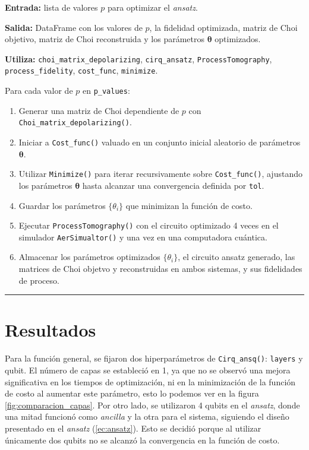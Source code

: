 \documentclass[letterpaper,12pt]{thesisECFM}
\theoremstyle{plain}
\theoremstyle{definition}
\theoremstyle{definition}
\theoremstyle{remark}
\newcommand{\1}{\mathbb{1}}
\begin{document}
\noindent\textbf{Entrada:} lista de valores $p$ para optimizar el \textit{ansatz}.

\noindent\textbf{Salida:} DataFrame con los valores de $p$, la fidelidad
optimizada, matriz de Choi objetivo, matriz de Choi reconstruida y los
parámetros $\bm{\theta}$ optimizados.

\noindent\textbf{Utiliza:} \texttt{choi\_matrix\_depolarizing},
\texttt{cirq\_ansatz}, \texttt{ProcessTomography}, \texttt{process\_fidelity},
\texttt{cost\_func}, \texttt{minimize}. \newline

Para cada valor de $p$ en \texttt{p\_values}: 
\begin{enumerate}
    \item Generar una matriz de Choi dependiente de $p$ con \texttt{Choi\_matrix\_depolarizing()}.
    \item Iniciar a  \texttt{Cost\_func()} valuado en un conjunto inicial
aleatorio de parámetros $\bm{\theta}$. 
   \item Utilizar \texttt{Minimize()} para iterar recursivamente sobre
\texttt{Cost\_func()}, ajustando los parámetros $\bm{\theta}$ hasta alcanzar
una convergencia definida por \texttt{tol}.
   \item Guardar los parámetros $\{ \theta_i\}$ que minimizan la función de
costo. 
   \item Ejecutar \texttt{ProcessTomography()} con el circuito optimizado 4
veces en el simulador \texttt{AerSimualtor()} y una vez en una computadora
cuántica. 
    \item Almacenar los parámetros optimizados $\{ \theta_i\}$, el circuito
ansatz generado, las matrices de Choi objetvo y reconstruidas en ambos
sistemas, y sus fidelidades de proceso. 
\end{enumerate}
\vspace{-.5cm}
\noindent\rule{\textwidth}{1mm}
\section{Resultados} %
\label{sec:resultados_dp}
Para la función general, se fijaron dos hiperparámetros de
\texttt{Cirq\_ansq()}: \texttt{layers} y  qubit. El número de capas se
estableció en 1, ya que no se observó una mejora significativa en los tiempos
de optimización, ni en la minimización de la función de costo al aumentar este
parámetro, esto lo podemos ver en la figura \ref{fig:comparacion_capas}. Por
otro lado, se utilizaron 4 qubits en el \textit{ansatz}, donde una mitad
funcionó como \textit{ancilla} y la otra para el sistema, siguiendo el diseño
presentado en el \textit{ansatz} (\ref{ec:ansatz}). Esto se decidió porque al
utilizar únicamente dos  qubits no se alcanzó la convergencia en la función de
costo. 
\end{document}
